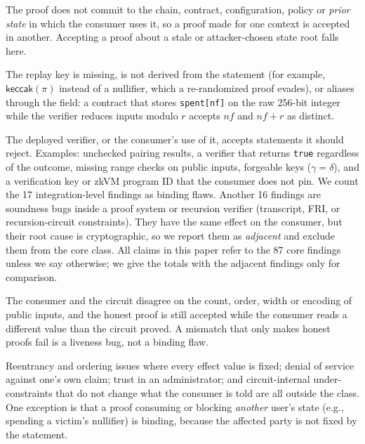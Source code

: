The proof does not commit to the chain, contract, configuration, policy or
\emph{prior state} in which the consumer uses it, so a proof made for one
context is accepted in another. Accepting a proof about a stale or
attacker-chosen state root falls here.

The replay key is missing, is not derived from the statement (for example,
$\mathsf{keccak}(\pi)$ instead of a nullifier, which a re-randomized proof
evades), or aliases through the field: a contract that stores
\texttt{spent[nf]} on the raw 256-bit integer while the verifier reduces
inputs modulo $r$ accepts $nf$ and $nf+r$ as distinct.

The deployed verifier, or the consumer's use of it, accepts statements it
should reject. Examples: unchecked pairing results, a verifier that returns
\texttt{true} regardless of the outcome, missing range checks on public inputs,
forgeable keys ($\gamma=\delta$), and a verification key or zkVM program ID
that the consumer does not pin. We count the 17 integration-level findings as
binding flaws. Another 16 findings are soundness bugs inside a proof system or
recursion verifier (transcript, FRI, or recursion-circuit constraints). They
have the same effect on the consumer, but their root cause is cryptographic,
so we report them as \emph{adjacent} and exclude them from the core class.
All claims in this paper refer to the 87 core findings unless we say
otherwise; we give the totals with the adjacent findings only for comparison.

The consumer and the circuit disagree on the count, order, width or encoding
of public inputs, and the honest proof is still accepted while the consumer
reads a different value than the circuit proved. A mismatch that only makes
honest proofs fail is a liveness bug, not a binding flaw.

Reentrancy and ordering issues where every effect value is fixed; denial of
service against one's own claim; trust in an administrator; and
circuit-internal under-constraints that do not change what the consumer is told
are all outside the class. One exception is that a proof consuming or
blocking \emph{another} user's state (e.g., spending a victim's nullifier) is
binding, because the affected party is not fixed by the statement.
